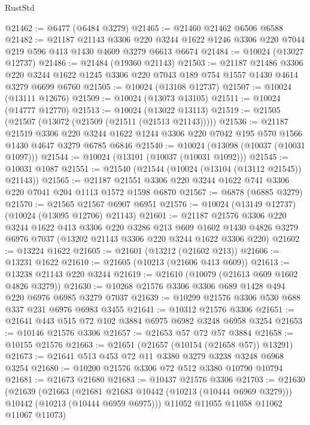 \begin{lexlean}{RustStd}
\begin{coremodule}
{\begin{coremodule}
{{{{{{{{{{{{{{{{{{{{{{{{{{@21462 := @6477 (@6484 @3279)
@21465 := @21460 @21462 @6506 @6588
@21482 := @21187
    @21143
    @3306
    @220
    @3244
    @1622
    @1246
    @3306
    @220
    @7044
    @219
    @596
    @413
    @1430
    @4609
    @3279
    @6613
    @6674
@21484 := @10024 (@13027 @12737)
@21486 := @21484 (@19360 @21143)
@21503 := @21187
    @21486
    @3306
    @220
    @3244
    @1622
    @1245
    @3306
    @220
    @7043
    @189
    @754
    @1557
    @1430
    @4614
    @3279
    @6699
    @6760
@21505 := @10024 (@13108 @12737)
@21507 := @10024 (@13111 @12676)
@21509 := @10024 (@13073 @13105)
@21511 := @10024 (@14777 @12770)
@21513 := @10024 (@13022 @13113)
@21519 := @21505 (@21507 (@13072 (@21509 (@21511 (@21513 @21143)))))
@21536 := @21187
    @21519
    @3306
    @220
    @3244
    @1622
    @1244
    @3306
    @220
    @7042
    @195
    @570
    @1566
    @1430
    @4647
    @3279
    @6785
    @6846
@21540 := @10024 (@13098 (@10037 (@10031 @1097)))
@21544 := @10024 (@13101 (@10037 (@10031 @1092)))
@21545 := @10031 @1087
@21551 := @21540 (@21544 (@10024 (@13104 (@13112 @21545)) @21143))
@21565 := @21187 @21551 @3306 @220 @3244 @1622 @741 @3306 @220 @7041 @204 @1113 @1572 @1598 @6870
@21567 := @6878 (@6885 @3279)
@21570 := @21565 @21567 @6907 @6951
@21576 := @10024 (@13149 @12737) (@10024 (@13095 @12706) @21143)
@21601 := @21187
    @21576
    @3306
    @220
    @3244
    @1622
    @413
    @3306
    @220
    @3286
    @213
    @609
    @1602
    @1430
    @4826
    @3279
    @6976
    @7037
    (@13202 @21143 @3306 @220 @3244 @1622 @3306 @220)
@21602 := @13224 @1622
@21605 := @21601 (@13212 (@21602 @213))
@21606 := @13231 @1622
@21610 := @21605 (@10213 (@21606 @413 @609))
@21613 := @13238 @21143 @220 @3244
@21619 := @21610 (@10079 (@21613 @609 @1602 @4826 @3279))
@21630 := @10268 @21576 @3306 @3306 @689 @1428 @494 @220 @6976 @6985 @3279 @7037
@21639 := @10299 @21576 @3306 @530 @688 @337 @231 @6976 @6983 @3455
@21641 := @10312 @21576 @3306
@21651 := @21641 @443 @515 @72 @102 @3884 @6975 @6982 @3248 @6958 @3254
@21653 := @10146 @21576 @3306
@21657 := @21653 @57 @72 @57 @3884
@21658 := @10155 @21576
@21663 := @21651 (@21657 (@10154 (@21658 @57)) @13291)
@21673 := @21641 @513 @453 @72 @11 @3380 @3279 @3238 @3248 @6968 @3254
@21680 := @10200 @21576 @3306 @72 @512 @3380 @10790 @10794
@21681 := @21673 @21680
@21683 := @10437 @21576 @3306
@21703 := @21630
    (@21639
      (@21663
        (@21681 @21683 @10442 (@10213 (@10444 @6969 @3279)))
        @10442
        (@10213 (@10444 @6959 @6975)))
      @11052
      @11055
      @11058
      @11062
      @11067
      @11073)
}}}}}}}}}}}}}}}}}}}}}}}}}}
\end{coremodule}}
\end{coremodule}
\end{lexlean}
